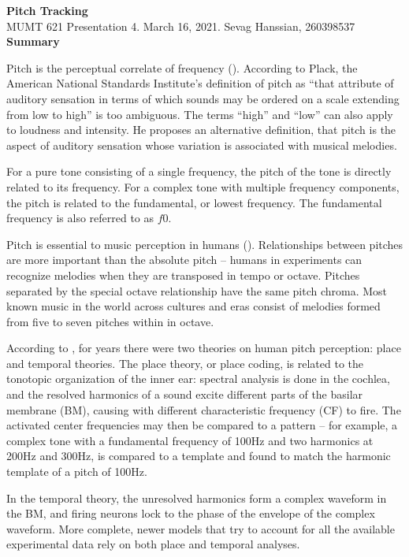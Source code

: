 \documentclass[letter,11pt]{report}
\begin{document}
\noindent\LARGE{\textbf{Pitch Tracking}}\\
\Large{MUMT 621 Presentation 4. March 16, 2021. Sevag Hanssian, 260398537}\\

\noindent\Large{\textbf{Summary}}

Pitch is the perceptual correlate of frequency (\cite{plack}). According to Plack, the American National Standards Institute's definition of pitch as ``that attribute of auditory sensation in terms of which sounds may be ordered on a scale extending from low to high'' is too ambiguous. The terms ``high'' and ``low'' can also apply to loudness and intensity. He proposes an alternative definition, that pitch is the aspect of auditory sensation whose variation is associated with musical melodies.

For a pure tone consisting of a single frequency, the pitch of the tone is directly related to its frequency. For a complex tone with multiple frequency components, the pitch is related to the fundamental, or lowest frequency. The fundamental frequency is also referred to as $\mathit{f0}$.

Pitch is essential to music perception in humans (\cite{musicevo}). Relationships between pitches are more important than the absolute pitch -- humans in experiments can recognize melodies when they are transposed in tempo or octave. Pitches separated by the special octave relationship have the same pitch chroma. Most known music in the world across cultures and eras consist of melodies formed from five to seven pitches within in octave.

According to \textcite{moore}, for years there were two theories on human pitch perception: place and temporal theories. The place theory, or place coding, is related to the tonotopic organization of the inner ear: spectral analysis is done in the cochlea, and the resolved harmonics of a sound excite different parts of the basilar membrane (BM), causing with different characteristic frequency (CF) to fire. The activated center frequencies may then be compared to a pattern -- for example, a complex tone with a fundamental frequency of 100Hz and two harmonics at 200Hz and 300Hz, is compared to a template and found to match the harmonic template of a pitch of 100Hz.

In the temporal theory, the unresolved harmonics form a complex waveform in the BM, and firing neurons lock to the phase of the envelope of the complex waveform. More complete, newer models that try to account for all the available experimental data rely on both place and temporal analyses.
\end{document}
